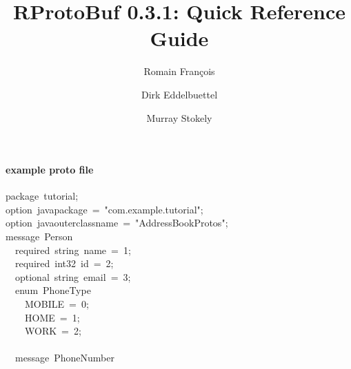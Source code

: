 \documentclass[10pt,twocolumn,a4paper]{article}
\author{Romain Fran\c{c}ois \and Dirk Eddelbuettel \and Murray Stokely}
\title{RProtoBuf 0.3.1: Quick Reference Guide}
\newenvironment{Houtput}%
{}%
{}%
\newcommand{\hlstd}[1]{\textcolor[rgb]{0,0,0}{#1}}%
\begin{document}
\maketitle
\thispagestyle{empty}

\paragraph{example proto file}

\begin{Houtput}

\ttfamily\noindent
package{\ }tutorial;\hspace*{\fill}\\
\hlstd{}option{\ }java\usebox{\hlnormalsizeboxunderscore}package{\ }={\ }"{}com.example.tutorial"{};\hspace*{\fill}\\
\hlstd{}option{\ }java\usebox{\hlnormalsizeboxunderscore}outer\usebox{\hlnormalsizeboxunderscore}classname{\ }={\ }"{}AddressBookProtos"{};\hspace*{\fill}\\
\hlstd{}message{\ }Person{\ }\usebox{\hlnormalsizeboxopenbrace}\hspace*{\fill}\\
\hlstd{}{\ }{\ }required{\ }string{\ }name{\ }={\ }1;\hspace*{\fill}\\
\hlstd{}{\ }{\ }required{\ }int32{\ }id{\ }={\ }2;{\ }{\ }{\ }{\ }{\ }{\ }{\ }{\ }\hspace*{\fill}\\
\hlstd{}{\ }{\ }optional{\ }string{\ }email{\ }={\ }3;\hspace*{\fill}\\
\hlstd{}{\ }{\ }enum{\ }PhoneType{\ }\usebox{\hlnormalsizeboxopenbrace}\hspace*{\fill}\\
\hlstd{}{\ }{\ }{\ }{\ }MOBILE{\ }={\ }0;\hspace*{\fill}\\
\hlstd{}{\ }{\ }{\ }{\ }HOME{\ }={\ }1;\hspace*{\fill}\\
\hlstd{}{\ }{\ }{\ }{\ }WORK{\ }={\ }2;\hspace*{\fill}\\
\hlstd{}{\ }{\ }\usebox{\hlnormalsizeboxclosebrace}\hspace*{\fill}\\
\hlstd{}{\ }{\ }message{\ }PhoneNumber{\ }\usebox{\hlnormalsizeboxopenbrace}\hspace*{\fill}\\

\end{Houtput}
\end{document}
